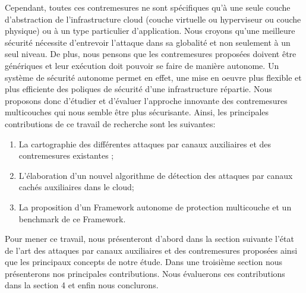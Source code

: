 \newline{}
\par
Cependant, toutes ces contremesures ne sont spécifiques qu’à une seule couche d’abstraction de l’infrastructure cloud (couche virtuelle ou hyperviseur ou couche physique) ou à un type particulier d’application. Nous croyons qu’une meilleure sécurité nécessite d’entrevoir l’attaque dans sa globalité et non seulement à un seul niveau. De plus, nous pensons que les contremesures proposées doivent  être génériques et leur exécution doit pouvoir se faire de manière autonome. Un système  de sécurité autonome permet en effet, une mise en oeuvre plus flexible et plus efficiente  des poliques de sécurité d'une infrastructure répartie. Nous proposons donc d’étudier et d’évaluer l’approche innovante des contremesures multicouches qui nous semble être plus sécurisante. 
Ainsi, les principales contributions  de ce travail de recherche  sont les suivantes:
\begin{enumerate}
 \item La cartographie des différentes attaques par canaux auxiliaires et des contremesures existantes ;
 \item L’élaboration d’un nouvel algorithme de détection des attaques par canaux cachés auxiliaires dans le cloud;
 \item La proposition d'un Framework autonome de protection multicouche et un benchmark de ce Framework.
\end{enumerate}

Pour mener ce travail, nous présenteront d'abord dans la section suivante l’état de l’art des attaques par canaux auxiliaires et des contremesures proposées ainsi que les principaux concepts de notre étude. Dans une troisième section nous présenterons nos principales contributions. Nous  évaluerons ces contributions dans la section 4  et enfin nous conclurons.     


